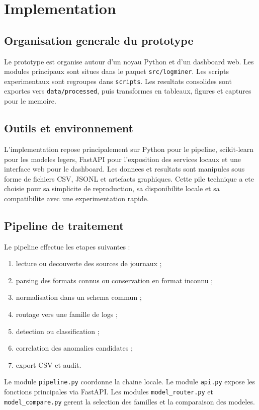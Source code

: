 \chapter{Implementation}

\section{Organisation generale du prototype}
Le prototype \logminer{} est organise autour d'un noyau Python et d'un dashboard web. Les modules principaux sont situes dans le paquet \texttt{src/logminer}. Les scripts experimentaux sont regroupes dans \texttt{scripts}. Les resultats consolides sont exportes vers \texttt{data/processed}, puis transformes en tableaux, figures et captures pour le memoire.

\section{Outils et environnement}
L'implementation repose principalement sur Python pour le pipeline, scikit-learn pour les modeles legers, FastAPI pour l'exposition des services locaux et une interface web pour le dashboard. Les donnees et resultats sont manipules sous forme de fichiers CSV, JSONL et artefacts graphiques. Cette pile technique a ete choisie pour sa simplicite de reproduction, sa disponibilite locale et sa compatibilite avec une experimentation rapide.

\section{Pipeline de traitement}
Le pipeline effectue les etapes suivantes :
\begin{enumerate}
  \item lecture ou decouverte des sources de journaux ;
  \item parsing des formats connus ou conservation en format inconnu ;
  \item normalisation dans un schema commun ;
  \item routage vers une famille de logs ;
  \item detection ou classification ;
  \item correlation des anomalies candidates ;
  \item export CSV et audit.
\end{enumerate}

Le module \texttt{pipeline.py} coordonne la chaine locale. Le module \texttt{api.py} expose les fonctions principales via FastAPI. Les modules \texttt{model\_router.py} et \texttt{model\_compare.py} gerent la selection des familles et la comparaison des modeles.

